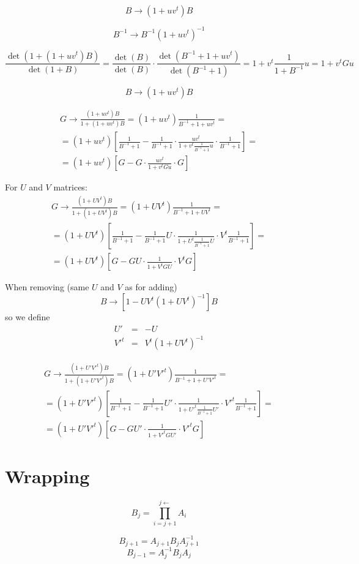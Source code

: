 \documentclass[onecolumn,english,prl,showpacs]{revtex4}
\begin{document}
\begin{equation}
 B \rightarrow (1+uv^t)B
\end{equation}

\begin{equation}
 B^{-1} \rightarrow B^{-1}(1+uv^t)^{-1}
\end{equation}

\begin{equation}
 \frac{\det(1+(1+uv^t)B)}{\det(1+B)} = \frac{\det(B)}{\det(B)}\cdot \frac{\det(B^{-1}+1+uv^t)}{\det(B^{-1}+1)} = 1+v^t\frac{1}{1+B^{-1}} u = 1+v^t G u
\end{equation}

\begin{equation}
 B \rightarrow (1+uv^t)B
\end{equation}

\begin{multline}
 G \rightarrow \frac{(1+uv^t)B}{1+(1+uv^t)B} = (1+uv^t)\frac{1}{B^{-1}+1+uv^t} =\\= (1+uv^t)\left[\frac{1}{B^{-1}+1}-\frac{1}{B^{-1}+1}\cdot\frac{uv^t}{1+v^t\frac{1}{B^{-1}+1}u}\cdot\frac{1}{B^{-1}+1}\right]=\\= (1+uv^t)\left[G-G\cdot\frac{uv^t}{1+v^tGu}\cdot G\right]
\end{multline}

For $U$ and $V$ matrices:
\begin{multline}
 G \rightarrow \frac{(1+UV^t)B}{1+(1+UV^t)B} = (1+UV^t)\frac{1}{B^{-1}+1+UV^t} =\\= (1+UV^t)\left[\frac{1}{B^{-1}+1}-\frac{1}{B^{-1}+1}U\cdot\frac{1}{1+U^t\frac{1}{B^{-1}+1}U}\cdot V^t\frac{1}{B^{-1}+1}\right]=\\= (1+UV^t)\left[G-GU\cdot\frac{1}{1+V^tGU}\cdot V^tG\right]
\end{multline}

When removing (same $U$ and $V$ as for adding)
\begin{equation}
 B \rightarrow [1-UV^t(1+UV^t)^{-1}]B
\end{equation}
so we define
\begin{eqnarray}
 U' &=& -U\\
 V'^t &=& V^t(1+UV^t)^{-1}
\end{eqnarray}

\begin{multline}
 G \rightarrow \frac{(1+U'V'^t)B}{1+(1+U'V'^t)B} = (1+U'V'^t)\frac{1}{B^{-1}+1+U'V'^t} =\\= (1+U'V'^t)\left[\frac{1}{B^{-1}+1}-\frac{1}{B^{-1}+1}U'\cdot\frac{1}{1+U'^t\frac{1}{B^{-1}+1}U'}\cdot V'^t\frac{1}{B^{-1}+1}\right]=\\= (1+U'V'^t)\left[G-GU'\cdot\frac{1}{1+V'^tGU'}\cdot V'^tG\right]
\end{multline}

\section{Wrapping}

\begin{equation}
 B_j = {\prod_{i=j+1}^{j\leftarrow}} A_i
\end{equation}

\begin{equation}
 B_{j+1} = A_{j+1} B_j A_{j+1}^{-1}
\end{equation}
\begin{equation}
 B_{j-1} = A_{j}^{-1} B_j A_{j}
\end{equation}
\end{document}
